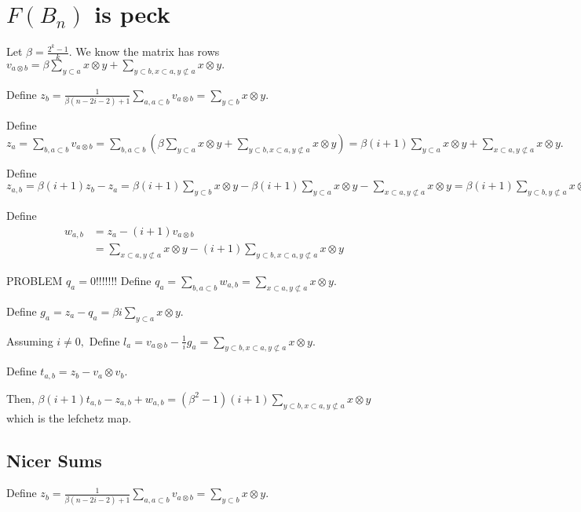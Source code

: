 \documentclass{amsart}
\begin{document}
\section{$F(B_n)$ is peck}
Let $\beta = \frac{2^k-1}{k}.$
We know the matrix has rows $v_{a \otimes b} =\beta \sum_{y \subset a}^{}x \otimes y + \sum_{y\subset b,x \subset a,y\not\subset a}^{}x\otimes y.$

Define $z_b =\frac{1}{\beta(n-2i-2)+1} \sum_{a,a\subset b}^{}v_{a\otimes b}= \sum_{y\subset b}^{}x\otimes y.$

Define $z_a = \sum_{b,a\subset b}^{}v_{a \otimes b} = \sum_{b,a\subset b}^{}(\beta \sum_{y\subset a}^{}x\otimes y + \sum_{y\subset b, x \subset a,y\not\subset a}^{}x \otimes y)= \beta (i+1) \sum_{y\subset a}^{}x\otimes y+ \sum_{x\subset a,y\not\subset a}^{}x\otimes y.$

Define $z_{a,b} = \beta (i+1) z_b - z_a =\beta (i+1) \sum_{y\subset b}^{}x\otimes y - \beta (i+1) \sum_{y\subset a}^{}x\otimes y - \sum_{x\subset a,y\not\subset a}^{}x\otimes y
=
\beta (i+1) \sum_{y\subset b,y\not\subset a}^{}x\otimes y - \sum_{x\subset a,y\not\subset a}^{}x\otimes y.$

Define
\begin{align*}
w_{a,b} &= z_a - (i+1)v_{a\otimes b}\\
&= \sum_{x\subset a,y\not\subset a}^{}x\otimes y - (i+1) \sum_{y\subset b,x\subset a,y\not\subset a}^{}x\otimes y
\end{align*}

PROBLEM $q_a = 0$!!!!!!!
Define $q_a = \sum_{b,a\subset b}^{}w_{a,b} = \sum_{x\subset a,y\not \subset a}^{}x\otimes y.$

Define $g_a = z_a - q_a = \beta i \sum_{y\subset a}^{}x\otimes y.$

Assuming $i \neq 0,$
Define $l_a = v_{a\otimes b} - \frac{1}{i}g_a = \sum_{y\subset b,x\subset a,y\not\subset a}^{}x\otimes y.$

Define $t_{a,b} = z_b - v_a\otimes v_b.$

Then, $\beta(i+1)t_{a,b} - z_{a,b} + w_{a,b} = (\beta^2 - 1)(i+1)\sum_{y\subset b,x\subset a,y\not\subset a}^{}x\otimes y$ which is the lefchetz map.

\subsection{Nicer Sums}

Define $z_b =\frac{1}{\beta(n-2i-2)+1} \sum_{a,a\subset b}^{}v_{a\otimes b}= \sum_{y\subset b}^{}x\otimes y.$
\end{document}
